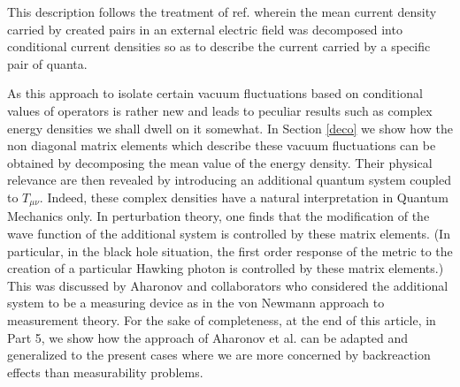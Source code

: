 This description follows the treatment
of ref. \cite{bmpps}
 wherein the mean current density carried by created pairs in an
external electric field was decomposed into conditional current densities
so as to describe the current carried by a specific pair of quanta.

As this approach to isolate certain
vacuum fluctuations based on
conditional values of operators
is
rather new
and leads to
peculiar
results such as
complex energy densities
we shall dwell on it somewhat. In
Section \ref{deco} we show how the non diagonal matrix elements which
describe these vacuum fluctuations can be obtained by decomposing the mean
value of the energy density.
Their
physical relevance are then revealed by introducing an additional quantum
system coupled to $T_{\mu\nu}$. Indeed, these complex densities
have a natural interpretation in Quantum Mechanics only.
In perturbation theory, one finds that the modification of the
wave function of the additional system is controlled by these matrix elements.
(In particular, in
the black hole situation, the first order response of the metric to the
creation of a particular Hawking photon is controlled by these
matrix elements.)
This was discussed
by Aharonov and collaborators\cite{aharo} who considered the additional
system to be a measuring device as in the von Newmann approach to measurement
theory\cite{Vonn}. For the sake of completeness, at
the end of this article, in Part 5, we show how
the approach of Aharonov et al. can be adapted and
generalized to the present cases where we are more concerned
by backreaction effects than measurability problems.

